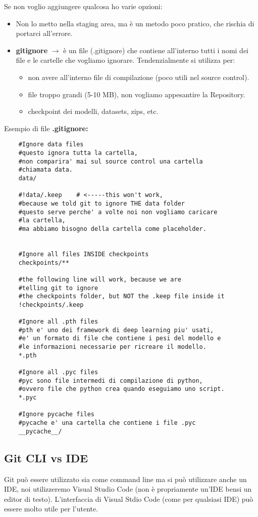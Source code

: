 \documentclass[a4paper,12pt]{article}
\begin{document}
Se non voglio aggiungere qualcosa ho varie opzioni:
\begin{itemize}
    \item Non lo metto nella staging area, ma è un metodo poco pratico, che rischia di portarci all'errore.
    \item \textbf{gitignore} $\rightarrow$ è un file (.gitignore) che contiene all'interno tutti i nomi dei file e le cartelle che vogliamo ignorare. Tendenzialmente si utilizza per:
    \begin{itemize}
        \item non avere all'interno file di compilazione (poco utili nel source control).
        \item file troppo grandi (5-10 MB), non vogliamo appesantire la Repository.
        \item checkpoint dei modelli, datasets, zips, etc.
    \end{itemize}
\end{itemize}
Esempio di file \textbf{.gitignore:}
\begin{lstlisting}
    #Ignore data files
    #questo ignora tutta la cartella,
    #non comparira' mai sul source control una cartella 
    #chiamata data.
    data/

    #!data/.keep    # <-----this won't work, 
    #because we told git to ignore THE data folder
    #questo serve perche' a volte noi non vogliamo caricare 
    #la cartella, 
    #ma abbiamo bisogno della cartella come placeholder.


    #Ignore all files INSIDE checkpoints
    checkpoints/**

    #the following line will work, because we are 
    #telling git to ignore 
    #the checkpoints folder, but NOT the .keep file inside it
    !checkpoints/.keep

    #Ignore all .pth files
    #pth e' uno dei framework di deep learning piu' usati, 
    #e' un formato di file che contiene i pesi del modello e
    #le informazioni necessarie per ricreare il modello.
    *.pth

    #Ignore all .pyc files
    #pyc sono file intermedi di compilazione di python, 
    #ovvero file che python crea quando eseguiamo uno script.
    *.pyc  

    #Ignore pycache files
    #pycache e' una cartella che contiene i file .pyc
    __pycache__/
\end{lstlisting}

\subsection{Git CLI vs IDE}
Git può essere utilizzato sia come command line ma si può utilizzare anche un IDE, noi utilizzeremo Visual Studio Code (non è propriamente un'IDE bensi un editor di testo).
L'interfaccia di Visual Stdio Code (come per qualsiasi IDE) può essere molto utile per l'utente.
\end{document}
